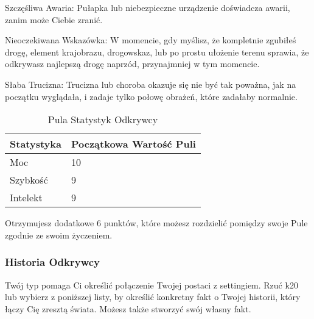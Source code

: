 Szczęśliwa Awaria: Pułapka lub niebezpieczne urządzenie doświadcza awarii, zanim może Ciebie zranić.

Nieoczekiwana Wskazówka: W momencie, gdy myślisz, że kompletnie zgubiłeś drogę, element krajobrazu, drogowskaz, lub po prostu ułożenie terenu sprawia, że odkrywasz najlepszą drogę naprzód, przynajmniej w tym momencie.

Słaba Trucizna: Trucizna lub choroba okazuje się nie być tak poważna, jak na początku wyglądała, i zadaje tylko połowę obrażeń, które zadałaby normalnie. 

\begin{table*}[t]
 \centering
 \begin{tabularx}{\textwidth}{ | X | X  |}
  \hline
   \textbf{Statystyka} & \textbf{Początkowa Wartość Puli} \\ \hline
    Moc & 10  \\ \hline
    Szybkość & 9  \\ \hline
    Intelekt & 9  \\ \hline
 \end{tabularx}
  \caption {Pula Statystyk Odkrywcy}
  \label {Pula Statystyk Odkrywcy}
 \end{table*}
 
 Otrzymujesz dodatkowe 6 punktów, które możesz rozdzielić pomiędzy swoje Pule zgodnie ze swoim życzeniem.
 
 \subsubsection{Historia Odkrywcy}
 
Twój typ pomaga Ci określić połączenie Twojej postaci z settingiem. Rzuć k20 lub wybierz z poniższej listy, by określić konkretny fakt o Twojej historii, który łączy Cię zresztą świata. Możesz także stworzyć swój własny fakt.

